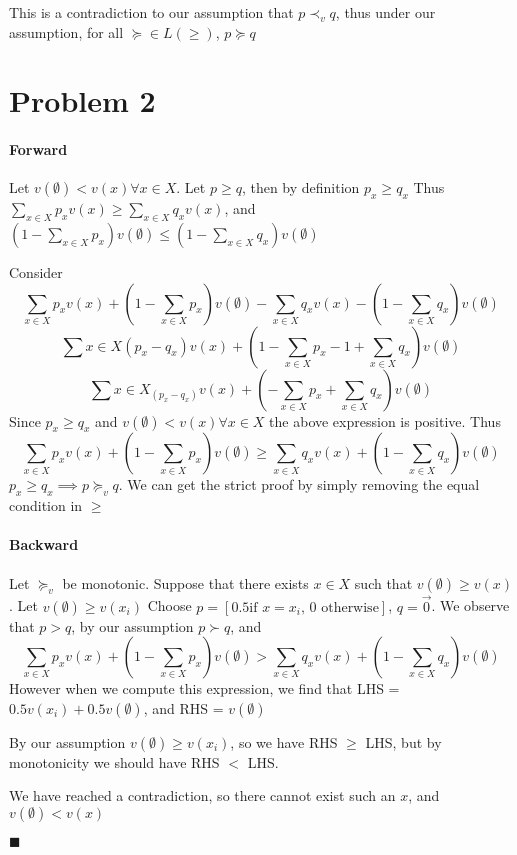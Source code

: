 \documentclass[12pt]{article}
\begin{document}
This is a contradiction to our assumption that $p \prec_v q$, thus under our assumption, for all 
$\succeq \in L(\geq)$, $p \succeq q$
\newpage

\section*{Problem 2}
\paragraph*{Forward}
Let $v(\emptyset) < v(x) \forall x \in X$. Let $p \geq q$, then by definition $p_x \geq q_x$
Thus $\sum_{x\in X}p_x v(x) \geq \sum_{x\in X}q_x v(x)$, and $(1-\sum_{x\in X}p_x)v(\emptyset) \leq (1-\sum_{x\in X}q_x)v(\emptyset)$

Consider 
\[\sum_{x\in X}p_x v(x) + (1-\sum_{x\in X}p_x)v(\emptyset) - \sum_{x\in X}q_x v(x) - (1-\sum_{x\in X}q_x)v(\emptyset)\]
\[\sum{x \in X} (p_x - q_x) v(x) + (1-\sum_{x\in X}p_x -1+ \sum_{x \in X}q_x)v(\emptyset)\]
\[\sum{x \in X}_(p_x - q_x) v(x) + (-\sum_{x\in X}p_x + \sum_{x \in X}q_x)v(\emptyset)\]
Since $p_x \geq q_x$ and $v(\emptyset) < v(x) \forall x \in X$ the above expression is positive.
Thus 
\[\sum_{x\in X}p_x v(x) + (1-\sum_{x\in X}p_x)v(\emptyset) \geq \sum_{x\in X}q_x v(x) + (1-\sum_{x\in X}q_x)v(\emptyset)\]
$p_x \geq q_x \implies p \succeq_v q$. We can get the strict proof by simply removing 
the equal condition in $\geq$

\paragraph*{Backward}
Let $\succeq_v$ be monotonic. Suppose that there exists $x \in X$ such that $v(\emptyset) \geq v(x)$. Let $v(\emptyset) \geq v(x_i)$ 
Choose $p=[0.5 \text{if $x=x_i$, 0 otherwise}]$, $q=\vec{0}$. We observe that $p > q$, by our assumption $p \succ q$, and
\[\sum_{x\in X}p_x v(x) + (1-\sum_{x\in X}p_x)v(\emptyset) > \sum_{x\in X}q_x v(x) + (1-\sum_{x\in X}q_x)v(\emptyset)\]
However when we compute this expression, we find that LHS = $0.5v(x_i) + 0.5v(\emptyset)$, and RHS = $v(\emptyset)$

By our assumption $v(\emptyset) \geq v(x_i)$, so we have RHS $\geq$ LHS, but by monotonicity we should have 
RHS $<$ LHS.

We have reached a contradiction, so there cannot exist such an $x$, and  $v(\emptyset) < v(x)$

$\blacksquare$

\newpage
\end{document}
